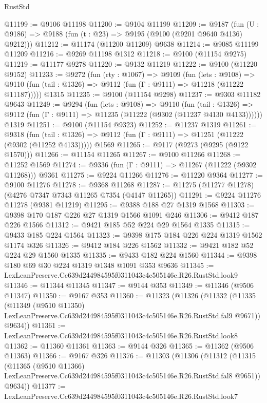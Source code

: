 \begin{lexlean}{RustStd}
\begin{coremodule}
@11199 := @9106 @11198
@11200 := @9104 @11199
@11209 := @9187
    (fun (U : @9186) => @9188 (fun (t : @23) => @9195 (@9100 (@9201 @9640 @4136) @9212)))
@11212 := @11174 (@11200 @11209) @9638
@11214 := @9085 @11199 @11209
@11216 := @9269 @11198 @1312
@11218 := @9100 (@11154 @9275)
@11219 := @11177 @9278
@11220 := @9132 @11219
@11222 := @9100 (@11220 @9152)
@11233 := @9272
    (fun (rty : @1067) =>
    @9109
      (fun (lets : @9108) =>
      @9110 (fun (tail : @1326) => @9112 (fun (Γ : @9111) => @11218 (@11222 @11187)))))
    @1315
@11235 := @9100 (@11154 @9298)
@11237 := @9303 @11182 @9643
@11249 := @9294
    (fun (lets : @9108) =>
    @9110
      (fun (tail : @1326) =>
      @9112 (fun (Γ : @9111) => @11235 (@11222 (@9302 (@11237 @4130 @4133))))))
    @1319
@11251 := @9100 (@11154 @9323)
@11252 := @11237 @1319
@11261 := @9318
    (fun (tail : @1326) => @9112 (fun (Γ : @9111) => @11251 (@11222 (@9302 (@11252 @4133)))))
    @1569
@11265 := @9117 (@9273 (@9295 (@9122 @1570)))
@11266 := @11154 @11265
@11267 := @9100 @11266
@11268 := @11252 @1569
@11274 := @9336 (fun (Γ : @9111) => @11267 (@11222 (@9302 @11268))) @9361
@11275 := @9224 @11266
@11276 := @11220 @9364
@11277 := @9100 @11276
@11278 := @9368 @11268
@11287 := @11275 (@11277 @11278) (@4276 @7347 @7343 @11265 @7354 (@4147 @11265))
@11291 := @9224 @11276 @11278 (@9381 @11219)
@11295 := @9388 @188 @27 @1319 @1568
@11303 := @9398 @170 @187 @226 @27 @1319 @1566 @1091 @246
@11306 := @9412 @187 @226 @1566
@11312 := @9421 @185 @52 @224 @29 @1564 @1335
@11315 := @9433 @185 @224 @1564
@11323 := @9398 @175 @184 @226 @224 @1319 @1562 @1174 @326
@11326 := @9412 @184 @226 @1562
@11332 := @9421 @182 @52 @224 @29 @1560 @1335
@11335 := @9433 @182 @224 @1560
@11344 := @9398 @180 @69 @30 @224 @1319 @1348 @1091 @353 @9636
@11345 := LexLeanPreserve.Cc639d244984595f0311043c4c505146e.R26.RustStd.look9
@11346 := @11344 @11345
@11347 := @9144 @353
@11349 := @11346 (@9506 @11347)
@11350 := @9167 @353
@11360 := @11323
    (@11326
      (@11332
        (@11335
          (@11349
            (@9510 @11350)
            LexLeanPreserve.Cc639d244984595f0311043c4c505146e.R26.RustStd.fal9
            @9671))
        @9634))
@11361 := LexLeanPreserve.Cc639d244984595f0311043c4c505146e.R26.RustStd.look8
@11362 := @11360 @11361
@11363 := @9144 @326
@11365 := @11362 (@9506 @11363)
@11366 := @9167 @326
@11376 := @11303
    (@11306
      (@11312
        (@11315
          (@11365
            (@9510 @11366)
            LexLeanPreserve.Cc639d244984595f0311043c4c505146e.R26.RustStd.fal8
            @9651))
        @9634))
@11377 := LexLeanPreserve.Cc639d244984595f0311043c4c505146e.R26.RustStd.look7

\end{coremodule}
\end{lexlean}
